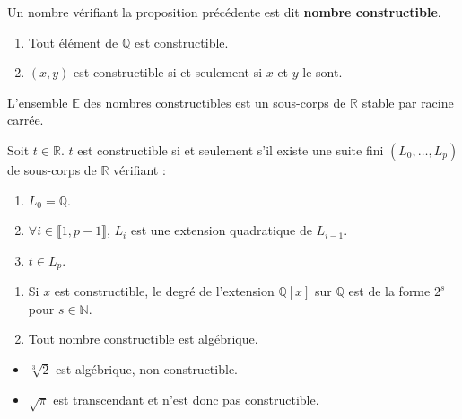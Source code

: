   \begin{definition}
    Un nombre vérifiant la proposition précédente est dit \textbf{nombre constructible}.
  \end{definition}

  \begin{proposition}
    \begin{enumerate}[label=(\roman*)]
      \item Tout élément de $\mathbb{Q}$ est constructible.
      \item $(x,y)$ est constructible si et seulement si $x$ et $y$ le sont.
    \end{enumerate}
  \end{proposition}

  \begin{theorem}
    L'ensemble $\mathbb{E}$ des nombres constructibles est un sous-corps de $\mathbb{R}$ stable par racine carrée.
  \end{theorem}


  \begin{theorem}[Wantzel]
    Soit $t \in \mathbb{R}$. $t$ est constructible si et seulement s'il existe une suite fini $(L_0, \dots, L_p)$ de sous-corps de $\mathbb{R}$ vérifiant :
    \begin{enumerate}[label=(\roman*)]
      \item $L_0 = \mathbb{Q}$.
      \item $\forall i \in \llbracket 1, p-1 \rrbracket$, $L_i$ est une extension quadratique de $L_{i-1}$.
      \item $t \in L_p$.
    \end{enumerate}
  \end{theorem}

  \begin{corollary}
    \begin{enumerate}[label=(\roman*)]
      \item Si $x$ est constructible, le degré de l'extension $\mathbb{Q}[x]$ sur $\mathbb{Q}$ est de la forme $2^s$ pour $s \in \mathbb{N}$.
      \item Tout nombre constructible est algébrique.
    \end{enumerate}
  \end{corollary}

  \begin{cexample}
    \begin{itemize}
      \item $\sqrt[3]{2}$ est algébrique, non constructible.
      \item $\sqrt{\pi}$ est transcendant et n'est donc pas constructible.
    \end{itemize}
  \end{cexample}


